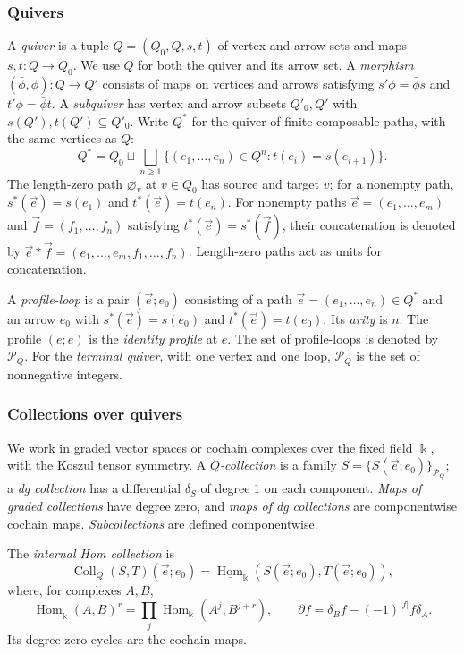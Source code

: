 \documentclass[11pt,letterpaper]{article}
\numberwithin{equation}{section}
\theoremstyle{plain}
\theoremstyle{definition}
\theoremstyle{remark}
\begin{document}
\subsubsection{Quivers}
\label{sss_directed_graphs}
A \textit{quiver} is a tuple $Q=(Q_0,Q,s,t)$ of vertex and arrow sets and maps
$s,t:Q\to Q_0$. We use $Q$ for both the quiver and its arrow set.
A \textit{morphism} $(\bar\phi,\phi):Q\to Q'$ consists of maps on vertices and
arrows satisfying $s'\phi=\bar\phi s$ and $t'\phi=\bar\phi t$.
A \textit{subquiver} has vertex and arrow subsets $Q'_0,Q'$ with
$s(Q'),t(Q')\subseteq Q'_0$.
Write $Q^*$ for the quiver of finite composable paths, with the same
vertices as $Q$:
\begin{equation*} Q^*=Q_0\sqcup\bigsqcup_{n\geq1}
 \{(e_1,\ldots,e_n)\in Q^n:t(e_i)=s(e_{i+1})\}.
\end{equation*}
The length-zero path $\varnothing_v$ at $v\in Q_0$ has source and target $v$;
for a nonempty path, $s^*(\vec e)=s(e_1)$ and
$t^*(\vec e)=t(e_n)$. For nonempty paths $\vec e=(e_1,\ldots,e_m)$ and
$\vec f=(f_1,\ldots,f_n)$ satisfying $t^*(\vec e)=s^*(\vec f)$, their
concatenation is denoted by
$\vec e*\vec f=(e_1,\ldots,e_m,f_1,\ldots,f_n)$.
Length-zero paths act as units for concatenation.

A \textit{profile-loop} is a pair $(\vec e;e_0)$ consisting of a
path $\vec e=(e_1,\ldots,e_n)\in Q^*$ and an arrow $e_0$
with $s^*(\vec e)=s(e_0)$ and $t^*(\vec e)=t(e_0)$.
Its \textit{arity} is $n$. The profile $(e;e)$ is the \textit{identity profile} at $e$.
The set of profile-loops is denoted by $\mathcal P_Q$.
For the \textit{terminal quiver}, with one vertex and one loop,
$\mathcal P_Q$ is the set of nonnegative integers.


\subsubsection{Collections over quivers}
\label{sss_collections_over_E}
We work in graded vector spaces or cochain complexes over the fixed
field $\Bbbk$, with the Koszul tensor symmetry. A \textit{$Q$-collection}
is a family $S=\{S(\vec e;e_0)\}_{\mathcal P_Q}$; a \textit{dg collection} has
a differential $\delta_S$ of degree $1$ on each component. \textit{Maps of graded collections} have degree zero, and \textit{maps of dg collections} are componentwise
cochain maps. \textit{Subcollections} are defined componentwise.

The \textit{internal Hom collection} is
\[
 \operatorname{Coll}_Q(S,T)(\vec e;e_0)
 =\underline{\operatorname{Hom}}_{\Bbbk}
       (S(\vec e;e_0),T(\vec e;e_0)),
\]
where, for complexes $A,B$,
\[
 \underline{\operatorname{Hom}}_{\Bbbk}(A,B)^r
 =\prod_j\operatorname{Hom}_{\Bbbk}(A^j,B^{j+r}),
 \qquad \partial f=\delta_B f-(-1)^{|f|}f\delta_A.
\]
Its degree-zero cycles are the cochain maps.
\end{document}
